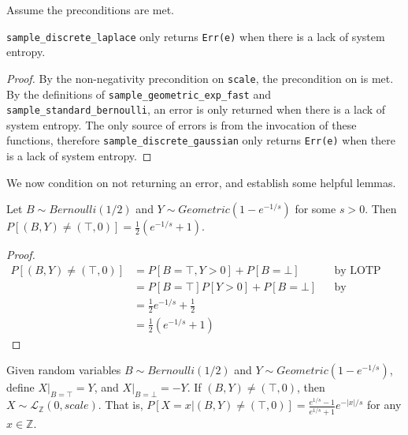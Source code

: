 \documentclass{article}
\begin{document}
Assume the preconditions are met.

\begin{lemma}
    \label{err-e}
    \texttt{sample\_discrete\_laplace} only returns \texttt{Err(e)} when there is a lack of system entropy.
\end{lemma}

\begin{proof}
    By the non-negativity precondition on \texttt{scale},
    the precondition on  is met.
    By the definitions of \texttt{sample\_geometric\_exp\_fast} and \texttt{sample\_standard\_bernoulli},
    an error is only returned when there is a lack of system entropy.
    The only source of errors is from the invocation of these functions,
    therefore \texttt{sample\_discrete\_gaussian} only returns \texttt{Err(e)} when there is a lack of system entropy.
\end{proof}

We now condition on not returning an error, and establish some helpful lemmas.
\begin{lemma}\cite{CKS20}\label{P_B_Y_ne_T_0}
    Let $B \sim Bernoulli(1/2)$ and $Y \sim Geometric(1 - e^{-1/s})$ for some $s > 0$.
    Then $P[(B, Y) \neq (\top, 0)] = \frac{1}{2} (e^{-1/s} + 1)$.
\end{lemma}

\begin{proof}
    \begin{align*}
        P[(B, Y) \neq (\top, 0)] &= P[B = \top, Y > 0] + P[B = \bot] && \text{by LOTP} \\
        &= P[B = \top] P[Y > 0] + P[B = \bot] && \text{by independence of B, Y} \\
        &= \frac{1}{2} e^{-1/s} + \frac{1}{2} \\
        &= \frac{1}{2} (e^{-1/s} + 1)
    \end{align*}
\end{proof}

\begin{lemma}\cite{CKS20}\label{P_Lx_BY_ne_T0}
    Given random variables $B \sim Bernoulli(1/2)$ and $Y \sim Geometric(1 - e^{-1/s})$, define $X|_{B=\top} = Y$, and $X|_{B=\bot} = -Y$.
    If $(B, Y) \neq (\top, 0)$, then $X \sim \mathcal{L}_\mathbb{Z}(0, scale)$.
    That is, $P[X = x | (B, Y) \neq (\top, 0)] = \frac{e^{1/s} - 1}{e^{1/s} + 1} e^{-|x|/s}$ for any $x \in \mathbb{Z}$.
\end{lemma}
\end{document}

